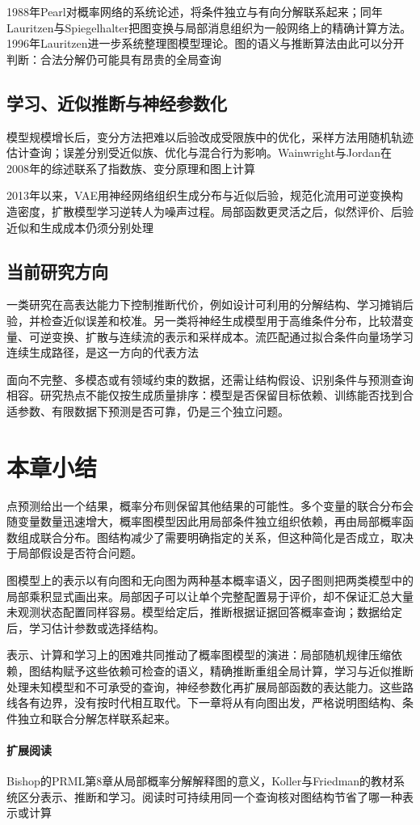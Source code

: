 1988年Pearl对概率网络的系统论述，将条件独立与有向分解联系起来；同年Lauritzen与Spiegelhalter把图变换与局部消息组织为一般网络上的精确计算方法。1996年Lauritzen进一步系统整理图模型理论。图的语义与推断算法由此可以分开判断：合法分解仍可能具有昂贵的全局查询

\subsection{学习、近似推断与神经参数化}

模型规模增长后，变分方法把难以后验改成受限族中的优化，采样方法用随机轨迹估计查询；误差分别受近似族、优化与混合行为影响。Wainwright与Jordan在2008年的综述联系了指数族、变分原理和图上计算

2013年以来，VAE用神经网络组织生成分布与近似后验，规范化流用可逆变换构造密度，扩散模型学习逆转人为噪声过程。局部函数更灵活之后，似然评价、后验近似和生成成本仍须分别处理

\subsection{当前研究方向}

一类研究在高表达能力下控制推断代价，例如设计可利用的分解结构、学习摊销后验，并检查近似误差和校准。另一类将神经生成模型用于高维条件分布，比较潜变量、可逆变换、扩散与连续流的表示和采样成本。流匹配通过拟合条件向量场学习连续生成路径，是这一方向的代表方法

面向不完整、多模态或有领域约束的数据，还需让结构假设、识别条件与预测查询相容。研究热点不能仅按生成质量排序：模型是否保留目标依赖、训练能否找到合适参数、有限数据下预测是否可靠，仍是三个独立问题。

\section{本章小结}
\label{sec:pgm-overview-summary}

点预测给出一个结果，概率分布则保留其他结果的可能性。多个变量的联合分布会随变量数量迅速增大，概率图模型因此用局部条件独立组织依赖，再由局部概率函数组成联合分布。图结构减少了需要明确指定的关系，但这种简化是否成立，取决于局部假设是否符合问题。

图模型上的表示以有向图和无向图为两种基本概率语义，因子图则把两类模型中的局部乘积显式画出来。局部因子可以让单个完整配置易于评价，却不保证汇总大量未观测状态配置同样容易。模型给定后，推断根据证据回答概率查询；数据给定后，学习估计参数或选择结构。

表示、计算和学习上的困难共同推动了概率图模型的演进：局部随机规律压缩依赖，图结构赋予这些依赖可检查的语义，精确推断重组全局计算，学习与近似推断处理未知模型和不可承受的查询，神经参数化再扩展局部函数的表达能力。这些路线各有边界，没有按时代相互取代。下一章将从有向图出发，严格说明图结构、条件独立和联合分解怎样联系起来。

\paragraph{扩展阅读}
Bishop的PRML第8章从局部概率分解解释图的意义，Koller与Friedman的教材系统区分表示、推断和学习。阅读时可持续用同一个查询核对图结构节省了哪一种表示或计算
